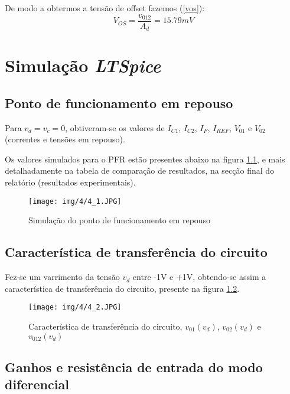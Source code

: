 \documentclass[a4paper,2pt]{report}
\begin{document}
\par De modo a obtermos a tensão de offset fazemos (\ref{vos}):
\begin{equation}
    V_{OS} = \frac{v_{012}}{A_d} = 15.79\textit{mV}
    \label{vos}
\end{equation}


\chapter{Simulação \textit{LTSpice}}

\section{Ponto de funcionamento em repouso}

\par Para \(v_d = v_c = 0\), obtiveram-se os valores de \(I_{C1}\), \(I_{C2}\), \(I_{F}\), \(I_{\textit{REF}}\), \(V_{01}\) e \(V_{02}\) (correntes e tensões em repouso).

\par Os valores simulados para o PFR estão presentes abaixo na figura \ref{4_1}, e mais detalhadamente na tabela de comparação de resultados, na secção final do relatório (resultados experimentais).

\begin{figure}[H]
    \centering
    \texttt{[image: img/4/4\_1.JPG]}
    \caption{Simulação do ponto de funcionamento em repouso}
    \label{4_1}
\end{figure}

\section{Característica de transferência do circuito}

\par Fez-se um varrimento da tensão \(v_d\) entre -1V e +1V, obtendo-se assim a característica de transferência do circuito, presente na figura \ref{4_2}.

\begin{figure}[H]
    \centering
    \texttt{[image: img/4/4\_2.JPG]}
    \caption{Característica de transferência do circuito, \(v_{01}(v_d)\), \(v_{02}(v_d)\) e \(v_{012}(v_d)\)}
    \label{4_2}
\end{figure}

\section{Ganhos e resistência de entrada do modo diferencial}
\end{document}
